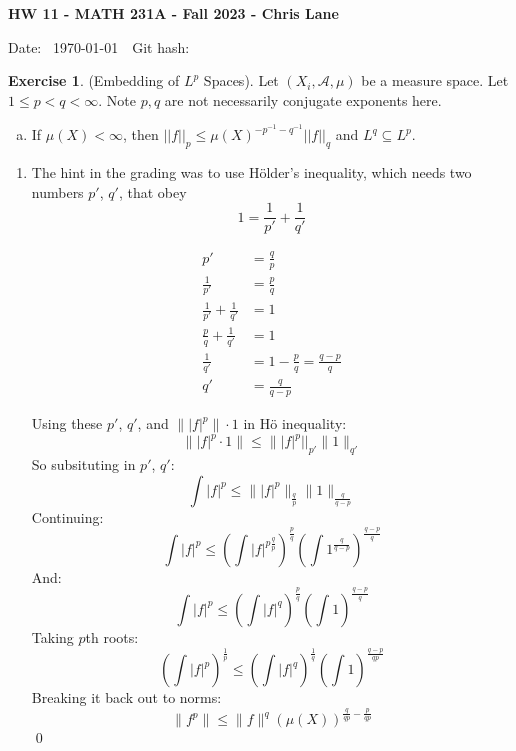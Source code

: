 \documentclass[11pt,oneside]{article}
\numberwithin{equation}{section}
\theoremstyle{definition}
\newtheorem{exercise}{Exercise}
\def\fancyA{\mathscr{A}}
\begin{document}
\textbf{HW 11 - MATH 231A - Fall 2023 - Chris Lane}

Date: \hhmmsstime{} \ \today \ \ Git hash: 
 

\begin{exercise}
  (Embedding of $L^p$ Spaces).  Let $(X_i, \fancyA, \mu)$ be a measure space.
  Let $1 \leq p < q < \infty$.  Note $p, q$ are not necessarily
  conjugate exponents here.
  \begin{enumerate}[(a)]
  \item
    If $\mu(X) < \infty$, then $||f||_p \leq \mu(X)^{-p^{-1}-q^{-1}} || f|| _q$ and $L^q \subseteq L^p$. 
  \end{enumerate}
\end{exercise}

\begin{solution}
  \begin{enumerate}
  \item
    The hint in the grading was to use H\"{o}lder's inequality, which needs two
    numbers $p'$, $q'$, that obey
    \[
      1 = \frac{1}{p'} + \frac{1}{q'}
  \]

  \begin{align*}
    p' & = \frac{q}{p} \\
    \frac{1}{p'} & = \frac{p}{q} \\
    \frac{1}{p'} + \frac{1}{q'} & = 1 \\
    \frac{p}{q}  + \frac{1}{q'} & = 1 \\
    \frac{1}{q'}  & = 1 - \frac{p}{q}  = \frac{q - p}{q} \\
    {q'}  & = \frac{q}{q - p} 
  \end{align*}

  Using these $p'$, $q'$, and $\| |f|^p \| \cdot 1 $ in H\"{o} inequality:
  \[
    \| |f|^p \cdot 1 \| \leq \| |f|^p || _ {p'} \| 1 \| _ {q'} 
  \]
  So subsituting in $p'$, $q'$:
  \[
    \int |f|^p \leq \| |f|^p \| _{\frac{q}{p}} \| 1 \| _{\frac{q}{q-p}} 
  \]
  Continuing: 
  \[
    \int |f|^p \leq \left( \int |f|^{p\frac{q}{p}} \right)^{\frac{p}{q}} \left( \int 1^{\frac{q}{q-p}} \right)^{\frac{q-p}{q}}
  \]
  And:
  \[
    \int |f|^p \leq \left( \int |f|^{q} \right)^{\frac{p}{q}} \left( \int 1 \right)^{\frac{q-p}{q}}
  \]
  Taking $p$th roots:
  \[
    \left( \int |f|^p \right) ^{\frac{1}{p}} \leq \left( \int |f|^{q} \right)^{\frac{1}{q}} \left( \int 1 \right)^{\frac{q-p}{qp}}
  \]
  Breaking it back out to norms:
  \[
    \| f^p \| \leq \| f \|^{q} \left( \mu(X) \right)^{\frac{q}{qp} - \frac{p}{qp}} 
  \]
  \qed
\end{enumerate}
\end{solution}
\end{document}
